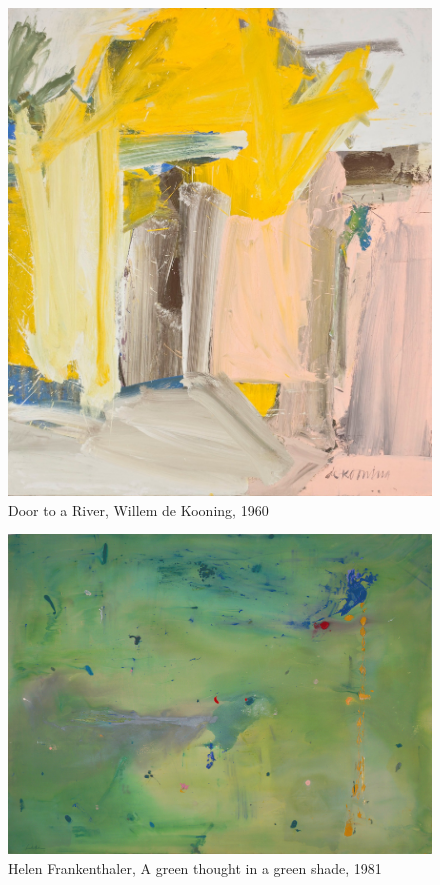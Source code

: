 \begin{figure}[h]
	\centering
		\includegraphics[width=12cm]{inspire/DoorToARiver.jpg}
		\caption{Door to a River, Willem de Kooning, 1960}
	\label{fig:DoorToARiver}
\end{figure}


\begin{figure}[h]
	\centering
	\includegraphics[width=12cm]{inspire/frankenthaler_ca27958.jpg}
	\caption{Helen Frankenthaler, A green thought in a green shade, 1981}
	\label{fig:GreenThought}
\end{figure}




